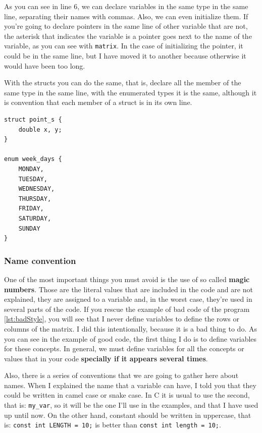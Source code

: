 \documentclass[a4paper]{article}
\begin{document}
As you can see in line 6, we can declare variables in the same type in the same
line, separating their names with commas. Also, we can even initialize them.
If you're going to declare pointers in the same line of other variable that are
not, the asterisk that indicates the variable is a pointer goes next to the name
of the variable, as you can see with \verb!matrix!. In the case of initializing
the pointer, it could be in the same line, but I have moved it to another
because otherwise it would have been too long.

With the structs you can do the same, that is, declare all the member of the
same type in the same line, with the enumerated types it is the same, although
it is convention that each member of a struct is in its own line.

\noindent
\begin{minipage}[H]{\linewidth}
\mbox{}
\begin{lstlisting}[style=C,
caption={Declaration of member of a \textit{struct} in a single line},
label={lst:singleLineDeclarationStruct}]
struct point_s {
    double x, y;
}

enum week_days {
    MONDAY,
    TUESDAY,
    WEDNESDAY,
    THURSDAY,
    FRIDAY,
    SATURDAY,
    SUNDAY
}
\end{lstlisting}
\end{minipage}

\subsubsection{Name convention}
One of the most important things you must avoid is the use of so called
\textbf{magic numbers}. Those are the literal values that are included in the
code and are not explained, they are assigned to a variable and, in the worst
case, they're used in several parts of the code. If you rescue the example of
bad code of the program \ref{lst:badStyle}, you will see that I never define
variables to define the rows or columns of the matrix. I did this intentionally,
because it is a bad thing to do. As you can see in the example of good code,
the first thing I do is to define variables for these concepts. In general, we
must define variables for all the concepts or values that in your code
\textbf{specially if it appears several times}.

Also, there is a series of conventions that we are going to gather here about
names. When I explained the name that a variable can have, I told you that they
could be written in camel case or snake case. In C it is usual to use the
second, that is: \verb!my_var!, so it will be the one I'll use in the examples,
and that I have used up until now. On the other hand, constant should be written
in uppercase, that is:  \lstinline[style=C]!const int LENGTH = 10;! is better
than \lstinline[style=C]!const int length = 10;!.
\end{document}
